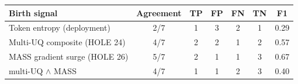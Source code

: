 \begin{tabular}{lcccccc}
\toprule
Birth signal & Agreement & TP & FP & FN & TN & F1 \\
\midrule
Token entropy (deployment) & 2/7 & 1 & 3 & 2 & 1 & 0.29 \\
Multi-UQ composite (HOLE 24) & 4/7 & 2 & 2 & 1 & 2 & 0.57 \\
MASS gradient surge (HOLE 26) & 5/7 & 2 & 1 & 1 & 3 & 0.67 \\
multi-UQ $\wedge$ MASS & 4/7 & 1 & 1 & 2 & 3 & 0.40 \\
\bottomrule
\end{tabular}